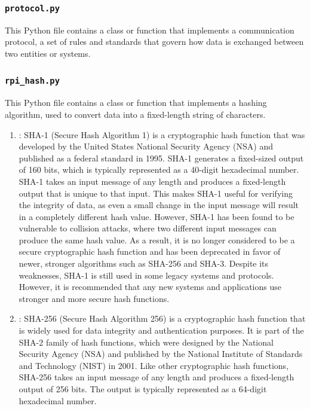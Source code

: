 \documentclass{article}
\newcommand{\code}[1]{\tcbox[
    on line,
    colback=codebackground, boxsep=2pt,
    colframe=white, boxrule=0pt,
    top=0pt, bottom=0pt, left=0pt, right=0pt
]{\texttt{#1}}}
\begin{document}
\subsubsection{\texttt{protocol.py}} This Python file contains a class or function that implements a communication protocol, a set of rules and standards that govern how data is exchanged between two entities or systems.

\subsubsection{\texttt{rpi\_hash.py}} This Python file contains a class or function that implements a hashing algorithm, used to convert data into a fixed-length string of characters.
\begin{enumerate}
    \item \code{SHA1()}:
          SHA-1 (Secure Hash Algorithm 1) is a cryptographic hash function that was developed by the United States National Security Agency (NSA) and published as a federal standard in 1995. SHA-1 generates a fixed-sized output of 160 bits, which is typically represented as a 40-digit hexadecimal number.
          SHA-1 takes an input message of any length and produces a fixed-length output that is unique to that input. This makes SHA-1 useful for verifying the integrity of data, as even a small change in the input message will result in a completely different hash value.
          However, SHA-1 has been found to be vulnerable to collision attacks, where two different input messages can produce the same hash value. As a result, it is no longer considered to be a secure cryptographic hash function and has been deprecated in favor of newer, stronger algorithms such as SHA-256 and SHA-3.
          Despite its weaknesses, SHA-1 is still used in some legacy systems and protocols. However, it is recommended that any new systems and applications use stronger and more secure hash functions.
    \item \code{SHA256()}:
          SHA-256 (Secure Hash Algorithm 256) is a cryptographic hash function that is widely used for data integrity and authentication purposes. It is part of the SHA-2 family of hash functions, which were designed by the National Security Agency (NSA) and published by the National Institute of Standards and Technology (NIST) in 2001.
          Like other cryptographic hash functions, SHA-256 takes an input message of any length and produces a fixed-length output of 256 bits. The output is typically represented as a 64-digit hexadecimal number.

\end{enumerate}
\end{document}

